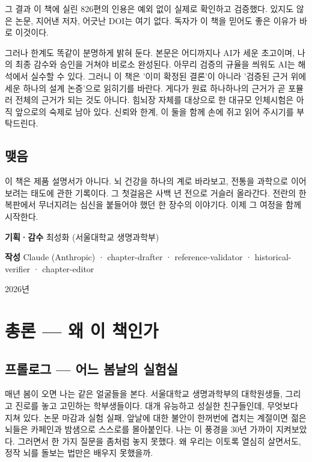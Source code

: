 \documentclass[12pt,oneside]{book}
\begin{document}
그 결과 이 책에 실린 826편의 인용은 예외 없이 실제로 확인하고 검증했다. 있지도 않은 논문, 지어낸 저자, 어긋난 DOI는 여기 없다. 독자가 이 책을 믿어도 좋은 이유가 바로 이것이다.

그러나 한계도 똑같이 분명하게 밝혀 둔다. 본문은 어디까지나 AI가 세운 초고이며, 나의 최종 감수와 승인을 거쳐야 비로소 완성된다. 아무리 검증의 규율을 씌워도 AI는 해석에서 실수할 수 있다. 그러니 이 책은 '이미 확정된 결론'이 아니라 '검증된 근거 위에 세운 하나의 설계 논증'으로 읽히기를 바란다. 게다가 원료 하나하나의 근거가 곧 포뮬러 전체의 근거가 되는 것도 아니다. 힘뇌장 자체를 대상으로 한 대규모 인체시험은 아직 앞으로의 숙제로 남아 있다. 신뢰와 한계, 이 둘을 함께 손에 쥐고 읽어 주시기를 부탁드린다.

\section{맺음}

이 책은 제품 설명서가 아니다. 뇌 건강을 하나의 계로 바라보고, 전통을 과학으로 이어 보려는 태도에 관한 기록이다. 그 첫걸음은 사백 년 전으로 거슬러 올라간다. 전란의 한복판에서 무너지려는 심신을 붙들어야 했던 한 장수의 이야기다. 이제 그 여정을 함께 시작한다.

\textbf{기획·감수} 최성화 (서울대학교 생명과학부)

\textbf{작성} Claude (Anthropic) · chapter-drafter · reference-validator · historical-verifier · chapter-editor

2026년

\clearpage
\tableofcontents
\clearpage

\mainmatter
\pagestyle{fancy}



\chapter{총론 — 왜 이 책인가}

\section{프롤로그 — 어느 봄날의 실험실}

매년 봄이 오면 나는 같은 얼굴들을 본다. 서울대학교 생명과학부의 대학원생들, 그리고 진로를 놓고 고민하는 학부생들이다. 대개 유능하고 성실한 친구들인데, 무엇보다 지쳐 있다. 논문 마감과 실험 실패, 앞날에 대한 불안이 한꺼번에 겹치는 계절이면 젊은 뇌들은 카페인과 밤샘으로 스스로를 몰아붙인다. 나는 이 풍경을 30년 가까이 지켜보았다. 그러면서 한 가지 질문을 좀처럼 놓지 못했다. 왜 우리는 이토록 열심히 살면서도, 정작 뇌를 돌보는 법만은 배우지 못했을까.
\end{document}
